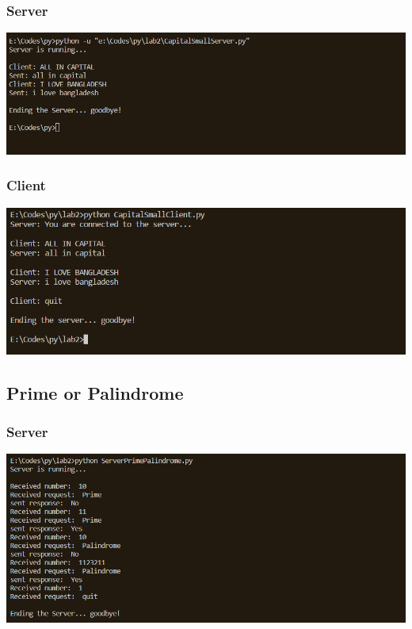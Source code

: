 \documentclass[11pt]{article}
\begin{document}
        \subsubsection{Server}
        \includegraphics[width=\textwidth]{Server Capital Small.png}
        \subsubsection{Client}
        \includegraphics[width=\textwidth]{Client Capital Small.png}
    \subsection{Prime or Palindrome}
        \subsubsection{Server}
        \includegraphics[width=\textwidth]{Server Prime Palindrome.png}
\end{document}
